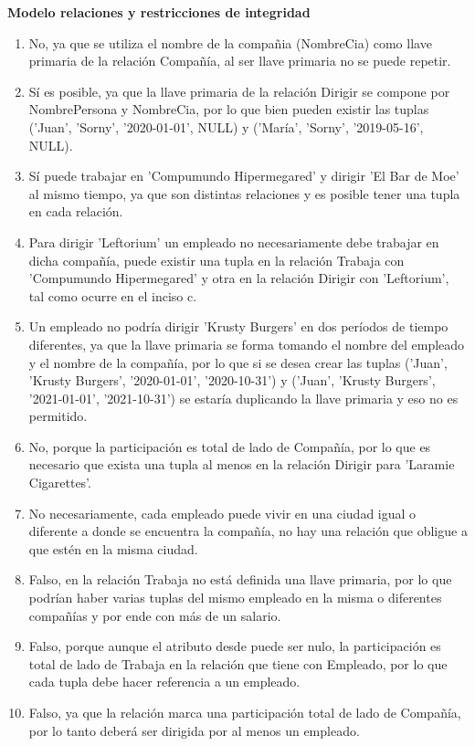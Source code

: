 \documentclass{exam}
\begin{document}
\begin{questions}
\begin{enumerate}[label=\alph*.]
		
	\end{enumerate}	
	
	\question \textbf{Modelo relaciones y restricciones de integridad}
	
	\begin{enumerate}[label=(\roman*)]
		\item No, ya que se utiliza el nombre de la compañia (NombreCia) como llave primaria de la relación Compañía, al ser llave primaria no se puede repetir.
		\item Sí es posible, ya que la llave primaria de la relación Dirigir se compone por NombrePersona y NombreCia, por lo que bien pueden existir las tuplas
('Juan', 'Sorny', '2020-01-01', NULL) y ('María', 'Sorny', '2019-05-16', NULL).
		\item Sí puede trabajar en 'Compumundo Hipermegared' y dirigir 'El Bar de Moe' al mismo tiempo, ya que son distintas relaciones y es posible tener una tupla en
cada relación.
		\item Para dirigir 'Leftorium' un empleado no necesariamente debe trabajar en dicha compañía, puede existir una tupla en la relación Trabaja con
'Compumundo Hipermegared' y otra en la relación Dirigir con 'Leftorium', tal como ocurre en el inciso c.
		\item Un empleado no podría dirigir 'Krusty Burgers' en dos períodos de tiempo diferentes, ya que la llave primaria se forma tomando el nombre del empleado y
el nombre de la compañía, por lo que si se desea crear las tuplas ('Juan', 'Krusty Burgers', '2020-01-01', '2020-10-31') y ('Juan', 'Krusty Burgers', '2021-01-01', '2021-10-31')
se estaría duplicando la llave primaria y eso no es permitido.
		\item No, porque la participación es total de lado de Compañía, por lo que es necesario que exista una tupla al menos en la relación Dirigir para 'Laramie Cigarettes'.
		\item No necesariamente, cada empleado puede vivir en una ciudad igual o diferente a donde se encuentra la compañía, no hay una relación que obligue
a que estén en la misma ciudad.
		\item Falso, en la relación Trabaja no está definida una llave primaria, por lo que podrían haber varias tuplas del mismo empleado en la misma
o diferentes compañías y por ende con más de un salario.
		\item Falso, porque aunque el atributo desde puede ser nulo, la participación es total de lado de Trabaja en la relación que tiene con Empleado, por lo que
cada tupla debe hacer referencia a un empleado.
		\item Falso, ya que la relación marca una participación total de lado de Compañía, por lo tanto deberá ser dirigida por al menos un empleado.
		
	\end{enumerate}	
	
	
\end{questions}
\end{document}
